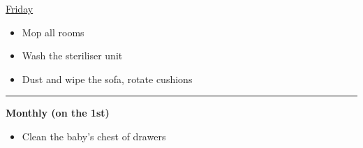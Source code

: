 \documentclass[12pt]{extarticle}
\begin{document}
\textsf{\underline{Friday}}

\begin{itemize}
  \item Mop all rooms
  \item Wash the steriliser unit
  \item Dust and wipe the sofa, rotate cushions
\end{itemize}

\bigskip

\hrule

\bigskip

\textsf{\textbf{\large{}Monthly (on the 1st)}}

\begin{itemize}
  \item Clean the baby's chest of drawers
\end{itemize}
\end{document}
